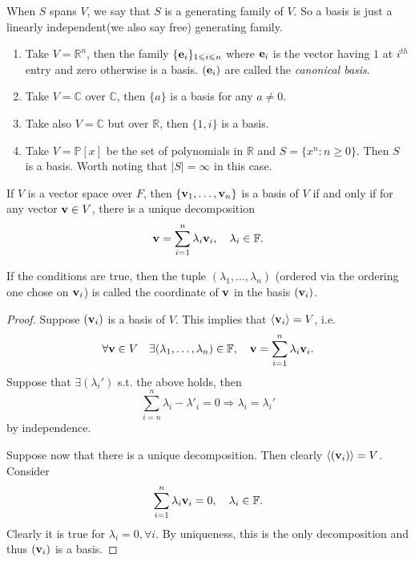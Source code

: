 \documentclass[a4paper,11pt]{article}
\begin{document}
\begin{remark}
    When $S$ spans $V$, we say that $S$ is a generating family of $V$.
    So a basis is just a linearly independent(we also say free) generating family.
\end{remark}
\begin{example}
    \begin{enumerate}
        \item Take $V=\mathbb R^n$, then the family $\{{\bf e}_i\}_{1\leqslant i\leqslant n}$ where ${\bf e}_i$ is the vector having $1$ at $i^{th}$ entry and zero otherwise is a basis. $ ({\bf e}_i) $ are called the \textit{canonical basis}.
        \item Take $V=\mathbb C$ over $\mathbb C$, then $\{a\}$ is a basis for any $a\neq 0$.
        \item Take also $V=\mathbb C$ but over $\mathbb R$, then $\{1,i\}$ is a basis.
        \item Take $V=\mathbb P[x]$ be the set of polynomials in $\mathbb R$ and $S=\{x^n:n\ge 0\}$.
        Then $S$ is a basis.
        Worth noting that $|S|=\infty$ in this case.
    \end{enumerate}
\end{example}
\begin{lemma}
    If $V$ is a vector space over $F$, then $\{{\bf v}_1,\ldots,{\bf v}_n\}$ is a basis of $V$ if and only if for any vector ${\bf v}\in V$, there is a unique decomposition
    $${\bf v}=\sum_{i=1}^n\lambda_i{\bf v}_i,\quad \lambda_i\in \mathbb{F}.$$
\end{lemma}
\begin{remark}
    If the conditions are true, then the tuple $(\lambda_1,\ldots,\lambda_n)$ (ordered via the ordering one chose on ${\bf v}_i$) is called the coordinate of ${\bf v}$ in the basis $({\bf v}_i)$.
\end{remark}
\begin{proof}
    Suppose $ ({\bf v}_i) $ is a basis of $V$. This implies that $ \langle {\bf v}_i \rangle =V $, i.e. 
    \[
        \forall {\bf v}\in V\quad \exists (\lambda_1,\dots,\lambda_n)\in {\mathbb{F}},\quad {\bf v} = \sum_{i=1}^{n}\lambda_i{\bf v}_i.
    \]
    Suppose that $ \exists (\lambda_i') $ s.t. the above holds, then 
    \[
        \sum_{i=n}^{n} \lambda_i-\lambda'_i=0 \Longrightarrow \lambda_i=\lambda_i'
    \]
    by independence.

    Suppose now that there is a unique decomposition. Then clearly $ \langle ({\bf v}_i) \rangle =V $. Consider 
    \[
        \sum_{i=1}^n\lambda_i{\bf v}_i=0,\quad \lambda_i\in \mathbb{F}.
    \]
    Clearly it is true for $ \lambda_i=0,\forall i $. By uniqueness, this is the only decomposition and thus $ ({\bf v}_i) $ is a basis.
\end{proof}
\end{document}
